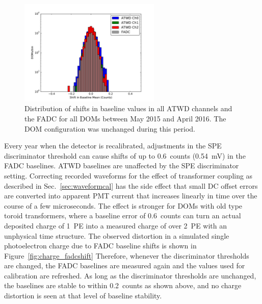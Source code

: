 \begin{figure}[!h]
 \centering
 \includegraphics[width=0.6\textwidth]{graphics/dom/reliability/baseline_stability_2015.pdf}
 \caption{Distribution of shifts in baseline values in all ATWD
   channels and the FADC for all DOMs between May 2015 and April
   2016. The DOM configuration was unchanged during this period.}
 \label{fig:baseline_stability_2015}
\end{figure}

Every year when the detector
is recalibrated, adjustments in the SPE discriminator threshold can
cause shifts of up to 0.6~counts (0.54~mV) in the FADC
baselines. ATWD baselines are unaffected by the SPE discriminator
setting. Correcting recorded waveforms for the effect of transformer
coupling as described in Sec.~\ref{sec:waveformcal} has
the side effect that small DC offset errors are converted into
apparent PMT current that increases linearly in time over the course
of a few microseconds. The effect is stronger for DOMs with old
type toroid transformers, where a baseline error of 0.6~counts can
turn an actual deposited charge of 1~PE into a measured charge of over
2~PE with an unphysical time structure. The observed distortion in a
simulated single photoelectron charge due to FADC baseline shifts is
shown in Figure~\ref{fig:charge_fadcshift}  Therefore, whenever the
discriminator thresholds are changed, the FADC baselines are measured
again and the values used for calibration are refreshed. As long as
the discriminator thresholds are unchanged, the baselines are stable
to within 0.2~counts
as shown above, and no charge distortion is seen at that level of
baseline stability.

